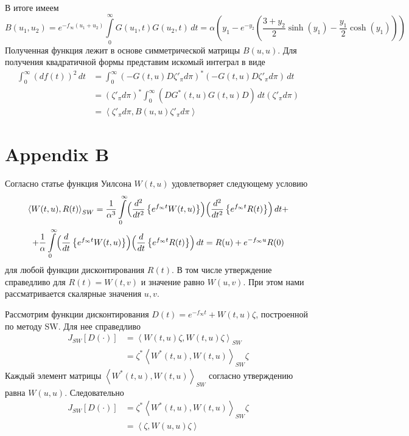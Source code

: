 \documentclass[10pt]{article}
\theoremstyle{definition}
\theoremstyle{remark}
\theoremstyle{plain}
\newcommand{\w}{f_\infty}
\newcommand{\scalar}[2]{\left<#1,#2\right>}
\begin{document}
В итоге имеем 
$$
B(u_1,u_2) = e^{-\w(u_1+u_2)}\int\limits_0^{\infty}G(u_1,t)G(u_2,t)\,dt = 
\alpha \left(y_1 - e^{-y_2}\left(\frac{3+y_2}{2}\sinh(y_1) - \frac{y_1}{2}\cosh(y_1)\right) \right)
$$
Полученная функция лежит в основе симметрической матрицы $B(u,u)$. Для получения квадратичной формы представим искомый интеграл в виде
\begin{align*}
\int_0^{\infty} (df(t))^2\,dt &= 
\int_0^{\infty} (-G(t,u)D\zeta'_{\pi}d\pi)^*(-G(t,u)D\zeta'_{\pi}d\pi)\,dt 
\\
&= (\zeta'_{\pi}d\pi)^* \int_0^{\infty} (DG^*(t,u)G(t,u)D)\,dt (\zeta'_{\pi}d\pi)
\\
&= \scalar{\zeta'_{\pi}d\pi}{ B(u,u) \zeta'_{\pi}d\pi}
\end{align*}

\section*{Appendix B}
Согласно статье \cite{Smith_Wilson} функция Уилсона $W(t,u)$ удовлетворяет следующему условию 
\begin{multline*}
\scalar{W(t,u)}{R(t)}_{SW} = 
		\frac{1}{\alpha^3}
		\int\limits_0^\infty 
		\Bigl(
			\frac{d^2}{dt^2}
			\left\{
				e^{\w t} W(t,u)
			\right\}
		\Bigr)
		\Bigl(
			\frac{d^2}{dt^2}
			\left\{
				e^{\w t} R(t)
			\right\}
		\Bigr)
		\, dt
		+
		\\
		+
		\frac{1}{\alpha}
		\int\limits_0^\infty 
		\Bigl(
			\frac{d}{dt}
			\left\{
				e^{\w t} W(t,u)
			\right\}
		\Bigr)
		\Bigl(
			\frac{d}{dt}
			\left\{
				e^{\w t} R(t)
			\right\}
		\Bigr)
		\, dt
		=
		R(u)+e^{-\w u }R(0)
\end{multline*}
для любой функции дисконтирования $R(t)$. В том числе утверждение справедливо для $R(t) = W(t,v)$ и значение равно $W(u,v)$. При этом нами рассматривается скалярные значения $u,v$.

Рассмотрим функции дисконтирования $D(t) = e^{-\w t}+ W(t,u)\zeta$, построенной по методу SW. Для нее справедливо 
\begin{align*}
J_{SW}[D(\cdot)] &= \scalar{W(t,u)\zeta}{W(t,u)\zeta}_{SW} 
\\
&= \zeta^*\scalar{W^*(t,u)}{W(t,u)}_{SW}\zeta
\end{align*}
Каждый элемент матрицы $\scalar{W^*(t,u)}{W(t,u)}_{SW}$ согласно утверждению равна $W(u,u)$. Следовательно
\begin{align*}
J_{SW}[D(\cdot)] &= \zeta^*\scalar{W^*(t,u)}{W(t,u)}_{SW}\zeta
\\
&= \scalar{\zeta}{W(u,u)\zeta}
\end{align*}
\newpage
\end{document}
